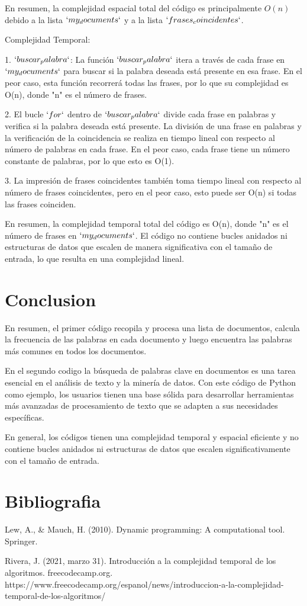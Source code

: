 \documentclass[a4paper,twocolumn,10pt]{article}
\begin{document}
En resumen, la complejidad espacial total del código es principalmente $O(n)$ debido a la lista $`my_documents`$ y a la lista $`frases_coincidentes`$.

Complejidad Temporal:

1. $`buscar_palabra`$: La función $`buscar_palabra`$ itera a través de cada frase en $`my_documents`$ para buscar si la palabra deseada está presente en esa frase. En el peor caso, esta función recorrerá todas las frases, por lo que su complejidad es O(n), donde "n" es el número de frases.

2. El bucle $`for`$ dentro de $`buscar_palabra`$ divide cada frase en palabras y verifica si la palabra deseada está presente. La división de una frase en palabras y la verificación de la coincidencia se realiza en tiempo lineal con respecto al número de palabras en cada frase. En el peor caso, cada frase tiene un número constante de palabras, por lo que esto es O(1).

3. La impresión de frases coincidentes también toma tiempo lineal con respecto al número de frases coincidentes, pero en el peor caso, esto puede ser O(n) si todas las frases coinciden.

En resumen, la complejidad temporal total del código es O(n), donde "n" es el número de frases en $`my_documents`$. El código no contiene bucles anidados ni estructuras de datos que escalen de manera significativa con el tamaño de entrada, lo que resulta en una complejidad lineal.
\section{Conclusion }

En resumen, el primer código recopila y procesa una lista de documentos, calcula la frecuencia de las palabras en cada documento y luego encuentra las palabras más comunes en todos los documentos.

En el segundo codigo la búsqueda de palabras clave en documentos es una tarea esencial en el análisis de texto y la minería de datos. Con este código de Python como ejemplo, los usuarios tienen una base sólida para desarrollar herramientas más avanzadas de procesamiento de texto que se adapten a sus necesidades específicas.


En general, los códigos tienen una complejidad temporal y espacial eficiente y no contiene bucles anidados ni estructuras de datos que escalen significativamente con el tamaño de entrada.

\section{Bibliografia  }

Lew, A., & Mauch, H. (2010). Dynamic programming: A computational tool. Springer.


Rivera, J. (2021, marzo 31). Introducción a la complejidad temporal de los algoritmos. freecodecamp.org. 
https://www.freecodecamp.org/espanol/news/introduccion-a-la-complejidad-temporal-de-los-algoritmos/
\end{document}
